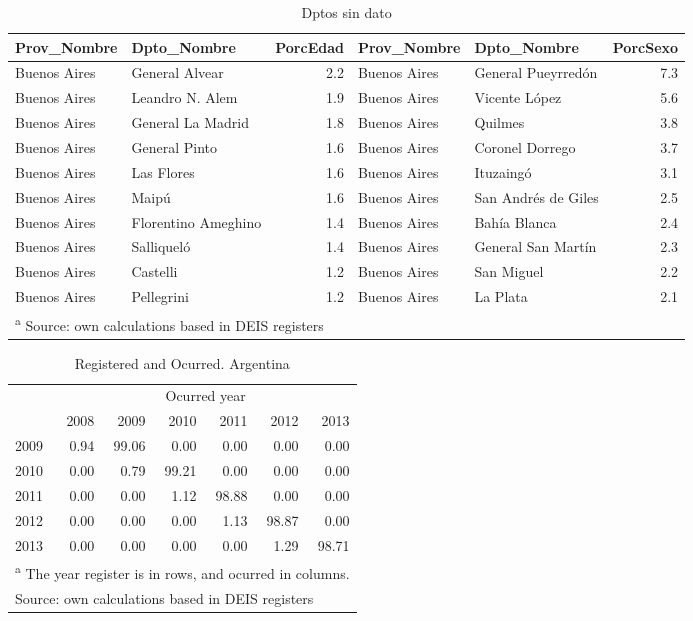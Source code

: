 \documentclass[12pt,]{article}
\begin{document}
\begin{table}

\caption{\label{tab:UnkSexAge}Dptos sin dato}
\centering
\begin{tabular}[t]{l|l|r|l|l|r}
\hline
Prov\_Nombre & Dpto\_Nombre & PorcEdad & Prov\_Nombre & Dpto\_Nombre & PorcSexo\\
\hline
Buenos Aires & General Alvear & 2.2 & Buenos Aires & General Pueyrredón & 7.3\\
\hline
Buenos Aires & Leandro N. Alem & 1.9 & Buenos Aires & Vicente López & 5.6\\
\hline
Buenos Aires & General La Madrid & 1.8 & Buenos Aires & Quilmes & 3.8\\
\hline
Buenos Aires & General Pinto & 1.6 & Buenos Aires & Coronel Dorrego & 3.7\\
\hline
Buenos Aires & Las Flores & 1.6 & Buenos Aires & Ituzaingó & 3.1\\
\hline
Buenos Aires & Maipú & 1.6 & Buenos Aires & San Andrés de Giles & 2.5\\
\hline
Buenos Aires & Florentino Ameghino & 1.4 & Buenos Aires & Bahía Blanca & 2.4\\
\hline
Buenos Aires & Salliqueló & 1.4 & Buenos Aires & General San Martín & 2.3\\
\hline
Buenos Aires & Castelli & 1.2 & Buenos Aires & San Miguel & 2.2\\
\hline
Buenos Aires & Pellegrini & 1.2 & Buenos Aires & La Plata & 2.1\\
\hline
\multicolumn{6}{l}{\textsuperscript{a} Source: own calculations based in DEIS registers}\\
\end{tabular}
\end{table}

\begin{table}

\caption{\label{tab:def_tardias}Registered and Ocurred. Argentina}
\centering
\begin{tabular}[t]{l|r|r|r|r|r|r}
\hline
\multicolumn{1}{c|}{ } & \multicolumn{6}{c}{Ocurred year} \\
\cline{2-7}
  & 2008 & 2009 & 2010 & 2011 & 2012 & 2013\\
\hline
2009 & 0.94 & 99.06 & 0.00 & 0.00 & 0.00 & 0.00\\
\hline
2010 & 0.00 & 0.79 & 99.21 & 0.00 & 0.00 & 0.00\\
\hline
2011 & 0.00 & 0.00 & 1.12 & 98.88 & 0.00 & 0.00\\
\hline
2012 & 0.00 & 0.00 & 0.00 & 1.13 & 98.87 & 0.00\\
\hline
2013 & 0.00 & 0.00 & 0.00 & 0.00 & 1.29 & 98.71\\
\hline
\multicolumn{7}{l}{\textsuperscript{a} The year register is in rows, and ocurred in columns.}\\
\multicolumn{7}{l}{Source: own calculations based in DEIS registers}\\
\end{tabular}
\end{table}
\end{document}
